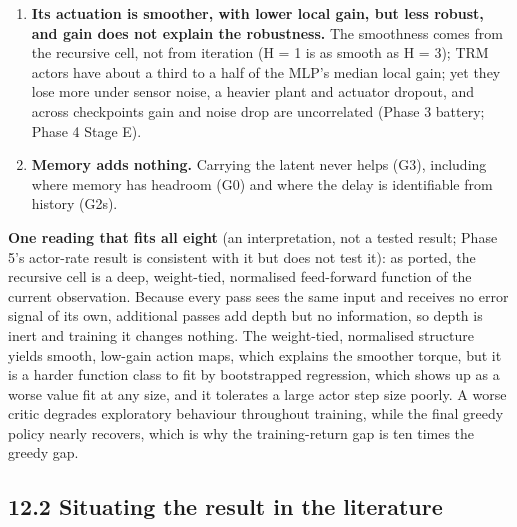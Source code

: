 \documentclass[11pt]{article}
\begin{document}
\begin{enumerate}
\item \textbf{Its actuation is smoother, with lower local gain, but less robust, and gain does not explain the robustness.} The smoothness comes from the recursive cell, not from iteration (H = 1 is as smooth as H = 3); TRM actors have about a third to a half of the MLP's median local gain; yet they lose more under sensor noise, a heavier plant and actuator dropout, and across checkpoints gain and noise drop are uncorrelated (Phase 3 battery; Phase 4 Stage E).
\item \textbf{Memory adds nothing.} Carrying the latent never helps (G3), including where memory has headroom (G0) and where the delay is identifiable from history (G2s).
\end{enumerate}



\textbf{One reading that fits all eight} (an interpretation, not a tested result; Phase 5's actor-rate result is consistent with it but does not test it): as ported, the recursive cell is a deep, weight-tied, normalised feed-forward function of the current observation. Because every pass sees the same input and receives no error signal of its own, additional passes add depth but no information, so depth is inert and training it changes nothing. The weight-tied, normalised structure yields smooth, low-gain action maps, which explains the smoother torque, but it is a harder function class to fit by bootstrapped regression, which shows up as a worse value fit at any size, and it tolerates a large actor step size poorly. A worse critic degrades exploratory behaviour throughout training, while the final greedy policy nearly recovers, which is why the training-return gap is ten times the greedy gap.



\subsection*{12.2 Situating the result in the literature}
\end{document}
